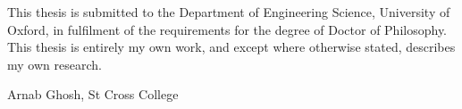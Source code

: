 \begin{originality}

This thesis is submitted to the Department of Engineering Science, University of
Oxford, in fulfilment of the requirements for the degree of Doctor of Philosophy.
This thesis is entirely my own work, and except where otherwise stated, describes
my own research.

Arnab Ghosh, St Cross College

\end{originality}